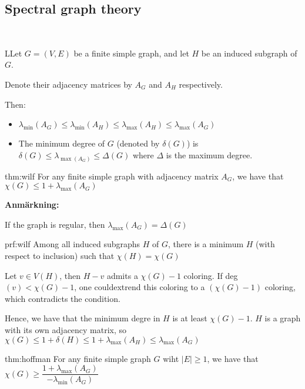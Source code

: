 \subsection{Spectral graph theory}\hfill\\\par
\begin{lem}
  LLet $G = (V,E)$ be a finite simple graph, and let $H$ be an induced subgraph of $G$.\par
  \noindent Denote their adjacency matrices by $A_G$ and $A_H$ respectively.\par
  \noindent Then:\par
  \begin{itemize}
    \item $\lambda_{\min}(A_G)\leq\lambda_{\min}(A_H)\leq\lambda_{\max}(A_H)\leq\lambda_{\max}(A_G)$
    \item The minimum degree of $G$ (denoted by $\delta(G)$) is $\delta(G)\leq \lambda_{\max(A_G)}\leq\Delta(G)$ where $\Delta$ is the maximum degree.
  \end{itemize}
\end{lem}
\par\bigskip
\begin{theo}[Wilf]{thm:wilf}
  For any finite simple graph with adjacency matrix $A_G$, we have that $\chi(G)\leq 1+\lambda_{\max}(A_G)$
\end{theo}
\par\bigskip
\noindent\textbf{Anmärkning:}\par
\noindent If the graph is regular, then $\lambda_{\max}(A_G) = \Delta(G)$
\par\bigskip
\begin{prf}[Wilf]{prf:wilf}
  Among all induced subgraphs $H$ of $G$, there is a minimum $H$ (with respect to inclusion) such that $\chi(H) = \chi(G)$\par
  \noindent Let $v\in V(H)$, then $H-v$ admits a $\chi(G)-1$ coloring. If deg$(v)<\chi(G)-1$, one couldextrend this coloring to a $(\chi(G)-1)$ coloring, which contradicts the condition.
  \par\bigskip
  \noindent Hence, we have that the minimum degre in $H$ is at least $\chi(G)-1$. $H$ is a graph with its own adjacency matrix, so $\chi(G)\leq 1+\delta(H)\leq1+\lambda_{\max}(A_H)\leq\lambda_{\max}(A_G)$
\end{prf}
\par\bigskip
\begin{theo}[Hoffman]{thm:hoffman}
  For any finite simple graph $G$ wiht $\left|E\right|\geq1$, we have that $\chi(G)\geq\dfrac{1+\lambda_{\max}(A_G)}{-\lambda_{\min}(A_G)}$
\end{theo}

